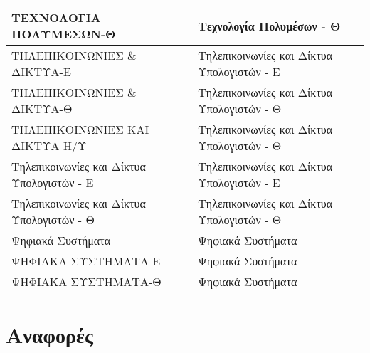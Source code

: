 \documentclass[12pt,a4paper,final]{article}
\begin{document}
\begin{landscape}
\begin{center}
\begin{longtable}{|l|l|}
\hline
ΤΕΧΝΟΛΟΓΙΑ ΠΟΛΥΜΕΣΩΝ-Θ                                                                                          & Τεχνολογία Πολυμέσων - Θ                                                                                             \\ 
\hline
ΤΗΛΕΠΙΚΟΙΝΩΝΙΕΣ \& ΔΙΚΤΥΑ-Ε                                                                                     & Τηλεπικοινωνίες και Δίκτυα Υπολογιστών - Ε                                                                           \\ 
\hline
ΤΗΛΕΠΙΚΟΙΝΩΝΙΕΣ \& ΔΙΚΤΥΑ-Θ                                                                                     & Τηλεπικοινωνίες και Δίκτυα Υπολογιστών - Θ                                                                           \\ 
\hline
ΤΗΛΕΠΙΚΟΙΝΩΝΙΕΣ ΚΑΙ ΔΙΚΤΥΑ Η/Υ                                                                                  & Τηλεπικοινωνίες και Δίκτυα Υπολογιστών - Θ                                                                           \\ 
\hline
Τηλεπικοινωνίες και Δίκτυα Υπολογιστών - Ε                                                                      & Τηλεπικοινωνίες και Δίκτυα Υπολογιστών - Ε                                                                           \\ 
\hline
Τηλεπικοινωνίες και Δίκτυα Υπολογιστών - Θ                                                                      & Τηλεπικοινωνίες και Δίκτυα Υπολογιστών - Θ                                                                           \\ 
\hline
Ψηφιακά Συστήματα                                                                                               & Ψηφιακά Συστήματα                                                                                                    \\ 
\hline
ΨΗΦΙΑΚΑ ΣΥΣΤΗΜΑΤΑ-Ε                                                                                             & Ψηφιακά Συστήματα                                                                                                    \\ 
\hline
ΨΗΦΙΑΚΑ ΣΥΣΤΗΜΑΤΑ-Θ                                                                                             & Ψηφιακά Συστήματα                                                                                                    \\
\hline


\end{longtable}
\end{center}




\end{landscape}
\clearpage

\section*{Αναφορές}
\printbibliography

\clearpage
\end{document}
